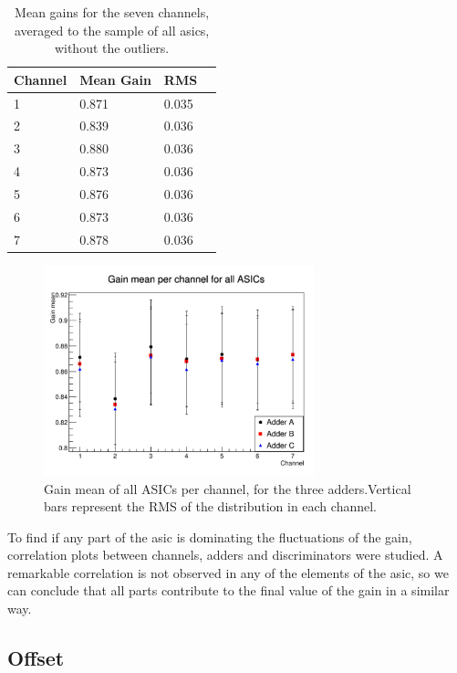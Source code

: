 \documentclass[main.tex]{subfiles}
\begin{document}
\begin{table}
  \centering
  \begin{tabular}{|l|l|l|l|}
    \hline
    Channel & Mean Gain & RMS \\
    \hline
    1 & 0.871 & 0.035 \\
    2 & 0.839 & 0.036 \\
    3 & 0.880 & 0.036 \\
    4 & 0.873 & 0.036 \\
    5 & 0.876 & 0.036 \\
    6 & 0.873 & 0.036 \\
    7 & 0.878 & 0.036 \\
    \hline
  \end{tabular}
  \caption{\label{tab:gainch} Mean gains for the seven channels, averaged to the sample of all asics, without the outliers.}
\end{table}

\begin{figure}[h]
  \centering
  \includegraphics[width=0.7\textwidth]{./Pictures/gainschannel.pdf}
  \caption{Gain mean of all ASICs per channel, for  the three adders.Vertical bars represent the RMS of the distribution in each channel.}\label{fig:gainch}
\end{figure}

To find if any part of the \gls{asic} is dominating the fluctuations of the gain, correlation plots between channels, adders and discriminators were studied. A remarkable correlation is not observed in any of the elements of the \gls{asic}, so we can conclude that all parts contribute to the final value of the gain in a similar way. 

\subsection{Offset}
\end{document}
